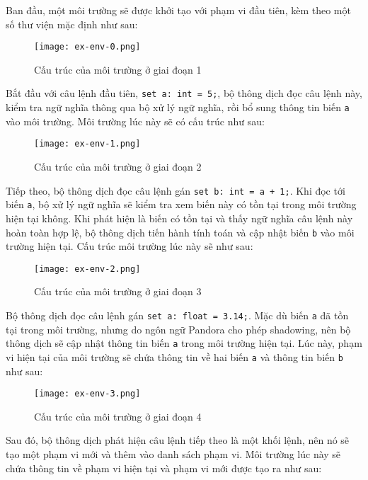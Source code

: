     Ban đầu, một môi trường sẽ được khởi tạo với phạm vi đầu tiên, kèm theo một số thư viện mặc định như sau:

\begin{figure}[H]
    \centering
    \texttt{[image: ex-env-0.png]}
    \caption{Cấu trúc của môi trường ở giai đoạn 1}
\end{figure}

    Bắt đầu với câu lệnh đầu tiên, \texttt{set a: int = 5;}, bộ thông dịch đọc câu lệnh này, kiểm tra ngữ nghĩa thông qua bộ xử lý ngữ nghĩa, rồi bổ sung thông tin biến \texttt{a} vào môi trường. Môi trường lúc này sẽ có cấu trúc như sau:

\begin{figure}[H]
    \centering
    \texttt{[image: ex-env-1.png]}
    \caption{Cấu trúc của môi trường ở giai đoạn 2}
\end{figure}

    Tiếp theo, bộ thông dịch đọc câu lệnh gán \texttt{set b: int = a + 1;}. Khi đọc tới biến \texttt{a}, bộ xử lý ngữ nghĩa sẽ kiểm tra xem biến này có tồn tại trong môi trường hiện tại không. Khi phát hiện là biến có tồn tại và thấy ngữ nghĩa câu lệnh này hoàn toàn hợp lệ, bộ thông dịch tiến hành tính toán và cập nhật biến \texttt{b} vào môi trường hiện tại. Cấu trúc môi trường lúc này sẽ như sau:

\begin{figure}[H]
    \centering
    \texttt{[image: ex-env-2.png]}
    \caption{Cấu trúc của môi trường ở giai đoạn 3}
\end{figure}

    Bộ thông dịch đọc câu lệnh gán \texttt{set a: float = 3.14;}. Mặc dù biến \texttt{a} đã tồn tại trong môi trường, nhưng do ngôn ngữ Pandora cho phép shadowing, nên bộ thông dịch sẽ cập nhật thông tin biến \texttt{a} trong môi trường hiện tại. Lúc này, phạm vi hiện tại của môi trường sẽ chứa thông tin về hai biến \texttt{a} và thông tin biến \texttt{b} như sau:

\begin{figure}[H]
    \centering
    \texttt{[image: ex-env-3.png]}
    \caption{Cấu trúc của môi trường ở giai đoạn 4}
\end{figure}

    Sau đó, bộ thông dịch phát hiện câu lệnh tiếp theo là một khối lệnh, nên nó sẽ tạo một phạm vi mới và thêm vào danh sách phạm vi. Môi trường lúc này sẽ chứa thông tin về phạm vi hiện tại và phạm vi mới được tạo ra như sau:

